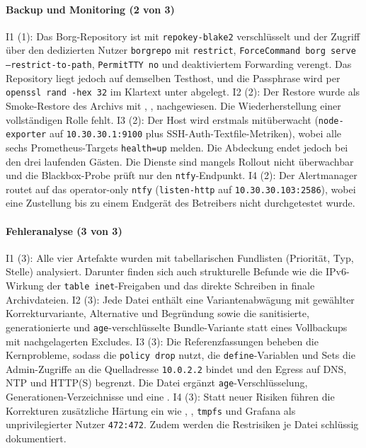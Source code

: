 {\paragraph{Backup und Monitoring (2 von 3)}
I1 (1): Das Borg-Repository ist mit \texttt{repokey-blake2} verschlüsselt und der Zugriff über den dedizierten Nutzer \texttt{borgrepo} mit \texttt{restrict}, \texttt{ForceCommand borg serve --restrict-to-path}, \texttt{PermitTTY no} und deaktiviertem Forwarding verengt.
Das Repository liegt jedoch auf demselben Testhost, und die Passphrase wird per \texttt{openssl rand -hex 32} im Klartext unter  abgelegt.\cite{section5scriptB,finalsummaryB}
I2 (2): Der Restore wurde als Smoke-Restore des Archivs  mit , ,  nachgewiesen.
Die Wiederherstellung einer vollständigen Rolle fehlt.\cite{finalsummaryB,validatornotesB}
I3 (2): Der Host wird erstmals mitüberwacht (\texttt{node-exporter} auf \texttt{10.30.30.1:9100} plus \ac{SSH}-Auth-Textfile-Metriken), wobei alle sechs Prometheus-Targets \texttt{health=up} melden. 
Die Abdeckung endet jedoch bei den drei laufenden Gästen. Die Dienste sind mangels Rollout nicht überwachbar und die Blackbox-Probe prüft nur den \texttt{ntfy}-Endpunkt.\cite{section5scriptB,finalsummaryB,implementationlogB}
I4 (2): Der Alertmanager routet auf das operator-only \texttt{ntfy} (\texttt{listen-http} auf \texttt{10.30.30.103:2586}), wobei eine Zustellung bis zu einem Endgerät des Betreibers nicht durchgetestet wurde.\cite{section5scriptB,finalsummaryB}

\paragraph{Fehleranalyse (3 von 3)}
I1 (3): Alle vier Artefakte wurden mit tabellarischen Fundlisten (Priorität, Typ, Stelle) analysiert. Darunter finden sich auch strukturelle Befunde wie die \ac{IP}v6-Wirkung der \texttt{table inet}-Freigaben und das direkte Schreiben in finale Archivdateien.\cite{artefaktreviewB}
I2 (3): Jede Datei enthält eine Variantenabwägung mit gewählter Korrekturvariante, Alternative und Begründung sowie die sanitisierte, generationierte und \texttt{age}-verschlüsselte Bundle-Variante statt eines Vollbackups mit nachgelagerten Excludes.\cite{artefaktreviewB}
I3 (3): Die Referenzfassungen beheben die Kernprobleme, sodass die  \texttt{policy drop} nutzt, die \texttt{define}-Variablen und Sets die Admin-Zugriffe an die Quelladresse \texttt{10.0.2.2} bindet und den Egress auf \ac{DNS}, \ac{NTP} und \ac{HTTP}(S) begrenzt.
Die Datei  ergänzt \texttt{age}-Verschlüsselung, Generationen-Verzeichnisse und eine .\cite{artefaktreviewB}
I4 (3): Statt neuer Risiken führen die Korrekturen zusätzliche Härtung ein wie , , \texttt{tmpfs} und Grafana als unprivilegierter Nutzer \texttt{472:472}. Zudem werden die Restrisiken je Datei schlüssig dokumentiert.\cite{artefaktreviewB}

}
